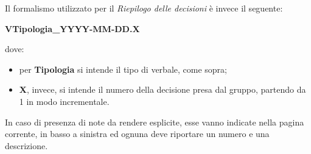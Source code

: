	Il formalismo utilizzato per il \textit{Riepilogo delle decisioni} è invece il seguente: 
	\begin{center}
	\textbf{VTipologia\_YYYY-MM-DD.X}
	\end{center}
	dove:
	\begin{itemize}
		\item per \textbf{Tipologia} si intende il tipo di verbale, come sopra;
		\item \textbf{X}, invece, si intende il numero della decisione presa dal gruppo, partendo da 1 in modo incrementale.
	\end{itemize}
	In caso di presenza di note da rendere esplicite, esse vanno indicate nella pagina corrente, in basso a sinistra ed ognuna deve riportare un numero e una descrizione.
